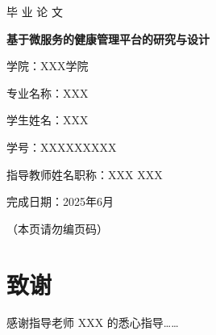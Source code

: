 \documentclass[12pt,a4paper]{article}
\begin{document}
\begin{titlepage}
\centering
\vspace*{2cm}
{ 毕 业 论 文 \par}
\vspace{2cm}
{ \bfseries 基于微服务的健康管理平台的研究与设计 \par}
\vspace{4cm}
\begin{flushleft}
{
学院：XXX学院 \par
专业名称：XXX \par
学生姓名：XXX \par
学号：XXXXXXXXX \par
指导教师姓名职称：XXX XXX \par
完成日期：2025年6月 \par
}
\end{flushleft}
\vfill
（本页请勿编页码）
\end{titlepage}





\clearpage
{}
\tableofcontents
\clearpage
{}


% 
% 




\clearpage
\section*{致谢}
感谢指导老师 XXX 的悉心指导……
\end{document}
